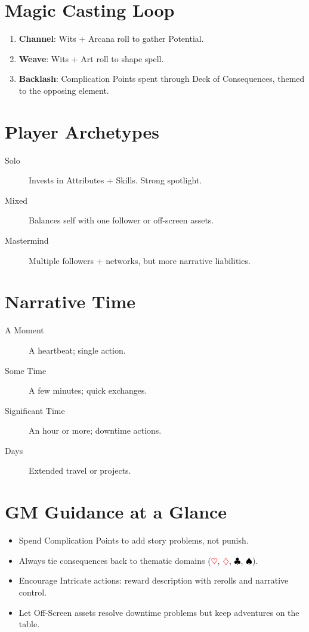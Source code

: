 \section{Magic Casting Loop}

\begin{enumerate}
\item \textbf{Channel}: Wits + Arcana roll to gather Potential.
\item \textbf{Weave}: Wits + Art roll to shape spell.
\item \textbf{Backlash}: Complication Points spent through Deck of Consequences, themed to the opposing element.
\end{enumerate}

\section{Player Archetypes}

\begin{description}
\item[Solo] Invests in Attributes + Skills. Strong spotlight.
\item[Mixed] Balances self with one follower or off-screen assets.
\item[Mastermind] Multiple followers + networks, but more narrative liabilities.
\end{description}

\section{Narrative Time}

\begin{description}
\item[A Moment] A heartbeat; single action.
\item[Some Time] A few minutes; quick exchanges.
\item[Significant Time] An hour or more; downtime actions.
\item[Days] Extended travel or projects.
\end{description}

\section{GM Guidance at a Glance}

\begin{itemize}
\item Spend Complication Points to add story problems, not punish.
\item Always tie consequences back to thematic domains (\textcolor{red}{$\heartsuit$}, \textcolor{red}{$\diamondsuit$}, \textcolor{black}{$\clubsuit$}, \textcolor{black}{$\spadesuit$}).
\item Encourage Intricate actions: reward description with rerolls and narrative control.
\item Let Off-Screen assets resolve downtime problems but keep adventures on the table.
\end{itemize}

